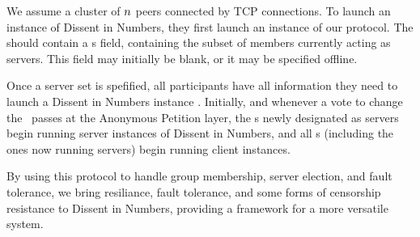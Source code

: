   We assume a cluster of $n$ peers connected by TCP connections. To
  launch an instance of Dissent in Numbers, they first launch an instance of our
  protocol. The \KwManifest should contain a \KwServer s field, containing the
  subset of \KwRoster members currently acting as servers. This field may
  initially be blank, or it may be specified offline.

  Once a server set is spefified, all participants have all information they
  need to launch a Dissent in Numbers instance \cite{din}. Initially, and
  whenever a vote to change the \KwManifest~passes at the Anonymous Petition
  layer, the \KwMember s newly designated as servers begin running server
  instances of Dissent in Numbers, and all \KwMember s (including the ones now
  running servers) begin running client instances.

  By using this protocol to handle group membership, server election, and fault
  tolerance, we bring resiliance, fault tolerance, and some forms of censorship
  resistance to Dissent in Numbers, providing a framework for a more versatile
  system.

